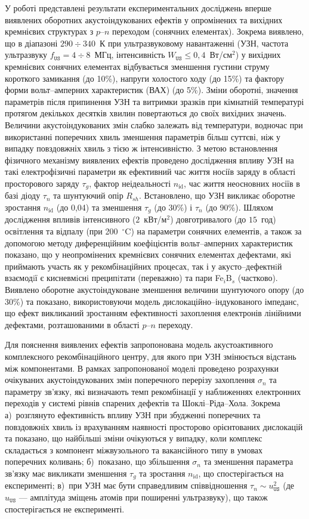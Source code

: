 У  роботі представлені результати експериментальних досліджень вперше виявлених оборотних акустоіндукованих ефектів у опромінених та вихідних кремнієвих структурах з  $p$--$n$ переходом (сонячних елементах).
Зокрема виявлено, що в діапазоні $290\div340$~К при ультразвуковому навантаженні (УЗН, частота ультразвуку $f_\mathtt{US}=4\div8$~МГц, інтенсивність $W_\mathtt{US}\leq0,4$~Вт/см$^2$) у вихідних кремнієвих сонячних елементах  відбувається  зменшення густини струму короткого замикання (до 10\%), напруги холостого ходу  (до 15\%) та фактору форми вольт--амперних характеристик (ВАХ) (до 5\%).
Зміни оборотні, значення параметрів  після припинення УЗН  та витримки зразків при кімнатній температурі протягом декількох десятків хвилин повертаються до своїх вихідних значень.
Величини акустоіндукованих змін слабко залежать від температури, водночас при використанні поперечних хвиль зменшення параметрів більш суттєві, ніж у випадку повздовжніх хвиль з тією ж інтенсивністю.
З метою встановлення фізичного механізму виявлених ефектів проведено дослідження впливу УЗН на такі електрофізичні параметри як
ефективний час життя носіїв заряду в області просторового заряду $\tau_{g}$,
фактор неідеальності $n_\mathrm{id}$,
час життя неосновних носіїв в базі діоду $\tau_n$
та шунтуючий опір $R_{sh}$.
Встановлено, що УЗН викликає оборотне зростання $n_\mathrm{id}$  (до 0,04) та зменшення $\tau_g$ (до 30\%) і
$\tau_n$ (до 90\%).
Шляхом дослідження  впливів інтенсивного ($2$~кВт/м$^2$) довготривалого (до  $15$~год) освітлення
та відпалу (при 200~$^\circ$C) на параметри сонячних елементів,
а також за допомогою
методу диференційним коефіцієнтів вольт--амперних характеристик показано, що
у неопромінених кремнієвих сонячних елементах
дефектами, які приймають участь як у рекомбінаційних процесах, так і у акусто--дефектнiй взаємодiї є кисневмiснi преципiтати (переважно) та
пари Fe$_i$B$_s$ (частково).
Виявлено оборотне акустоіндуковане зменшення величини шунтуючого опору (до 30\%) та показано,
використовуючи модель дислокаційно--індукованого імпеданс, що ефект викликаний зростанням ефективності захоплення електронів лінійними дефектами, розташованими в області $p$--$n$ переходу.


Для пояснення виявлених ефектів запропонована модель акустоактивного комплексного рекомбінаційного центру,
для якого при УЗН змінюється відстань між компонентами.
В рамках запропонованої моделі проведено розрахунки очікуваних акустоіндукованих змін поперечного перерізу захоплення $\sigma_{n}$ та параметру зв'язку,
які визначають темп рекомбінації у наближеннях електронних переходів у системі рівнів спарених дефектів та  Шоклі--Ріда--Хола.
Зокрема
а)~розглянуто ефективність впливу УЗН при збудженні поперечних та повздовжніх хвиль із врахуванням наявності просторово орієнтованих дислокацій та показано, що найбільші зміни очікуються у випадку, коли комплекс складається з компонент міжвузольного та вакансійного типу  в умовах поперечних коливань;
б)~показано, що збільшення $\sigma_{n}$ та зменшення параметра зв'язку має викликати зменшення $\tau_g$ та зростання $n_\mathrm{id}$, що спостерігається на експерименті;
в)~при УЗН має бути справедливим співвідношення $\tau_{n}\sim u_{\mathtt{US}}^2$ (де $u_\mathtt{US}$ --- амплітуда зміщень атомів при поширенні ультразвуку), що також спостерігається не експерименті.

